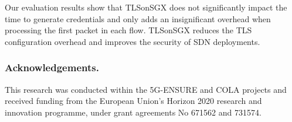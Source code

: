 {Our evaluation results show that TLSonSGX does not significantly impact the time to generate credentials and only adds an insignificant overhead when processing the first packet in each flow.
TLSonSGX reduces the TLS configuration overhead and improves the security of SDN deployments.




\subsubsection*{Acknowledgements.}
\label{sec:acknowledgements}

This research was conducted within the 5G-ENSURE and COLA projects and received  funding  from  the European Union's Horizon 2020 research and innovation programme, under grant agreements No 671562 and 731574.

%
%

%

{\raggedright
	\printbibliography[segment=\therefsegment,heading=subbibliography]
}

}


